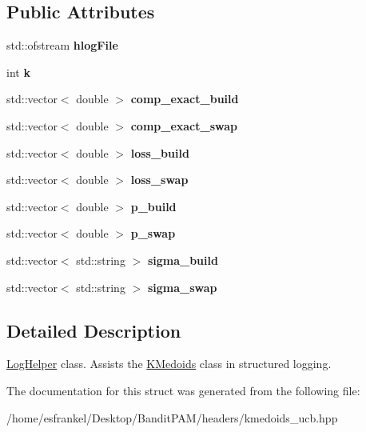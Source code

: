 \subsection*{Public Attributes}
\begin{DoxyCompactItemize}
\item 
\mbox{\label{structLogHelper_a084e11845451a653f46a48ab92c97ee8}} 
std\+::ofstream {\bfseries hlog\+File}
\item 
\mbox{\label{structLogHelper_ac606e3c78f973cb42f55ea6f8a11e509}} 
int {\bfseries k}
\item 
\mbox{\label{structLogHelper_a7f9490e07d6bfc71b0d0fd555ca4f530}} 
std\+::vector$<$ double $>$ {\bfseries comp\+\_\+exact\+\_\+build}
\item 
\mbox{\label{structLogHelper_aaee1d830760c6b497f2fad31a0e368f8}} 
std\+::vector$<$ double $>$ {\bfseries comp\+\_\+exact\+\_\+swap}
\item 
\mbox{\label{structLogHelper_a8da7e85d166977478fcfe848bb739dfa}} 
std\+::vector$<$ double $>$ {\bfseries loss\+\_\+build}
\item 
\mbox{\label{structLogHelper_a3361ae9284a7fca5b867165e0380af4b}} 
std\+::vector$<$ double $>$ {\bfseries loss\+\_\+swap}
\item 
\mbox{\label{structLogHelper_aed75dac28380b3f67b777d6b36719aa9}} 
std\+::vector$<$ double $>$ {\bfseries p\+\_\+build}
\item 
\mbox{\label{structLogHelper_a87a35e651ad2a32092777e1d9bd4acfa}} 
std\+::vector$<$ double $>$ {\bfseries p\+\_\+swap}
\item 
\mbox{\label{structLogHelper_a835a54928567970dd564d9eaed87597c}} 
std\+::vector$<$ std\+::string $>$ {\bfseries sigma\+\_\+build}
\item 
\mbox{\label{structLogHelper_afee211952d9a61c217622557e91c1275}} 
std\+::vector$<$ std\+::string $>$ {\bfseries sigma\+\_\+swap}
\end{DoxyCompactItemize}


\subsection{Detailed Description}
\hyperlink{structLogHelper}{Log\+Helper} class. Assists the \hyperlink{classKMedoids}{K\+Medoids} class in structured logging. 

The documentation for this struct was generated from the following file\+:\begin{DoxyCompactItemize}
\item 
/home/esfrankel/\+Desktop/\+Bandit\+P\+A\+M/headers/kmedoids\+\_\+ucb.\+hpp\end{DoxyCompactItemize}
